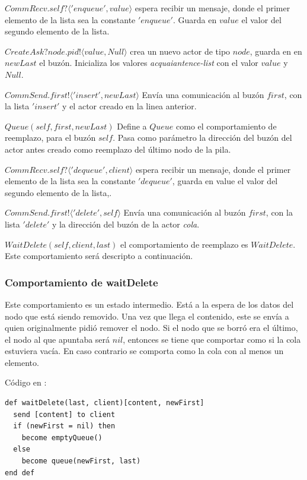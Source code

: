 \begin{description}
 \item $CommRecv.self? \langle 'enqueue', value \rangle$ espera recibir un mensaje, donde el primer elemento de la lista sea la constante $'enqueue'$. Guarda en $value$ el valor del segundo elemento de la lista.
 \item $CreateAsk?node.pid!\langle value, Null \rangle$ crea un nuevo actor de tipo $node$, guarda en en $newLast$ el buzón. Inicializa los valores \textit{acquaiantence-list} con el valor $value$ y $Null$.
 \item $CommSend.first!\langle 'insert', newLast \rangle$ Envía una comunicación al buzón $first$, con la lista $'insert'$ y el actor creado en la linea anterior. 
 \item $Queue(self, first, newLast)$ Define a $Queue$ como el comportamiento de reemplazo, para el buzón $self$. Pasa como parámetro la dirección del buzón del actor antes creado como reemplazo del último nodo de la pila.
 \item $CommRecv.self?\langle 'dequeue', client \rangle$ espera recibir un mensaje, donde el primer elemento de la lista sea la constante $'dequeue'$, guarda en value el valor del segundo elemento de la lista,.
 \item $CommSend.first!\langle 'delete', self \rangle$ Envía una comunicación al buzón $first$, con la lista $'delete'$ y la dirección del buzón de la actor \textit{cola}. 
 \item $WaitDelete(self, client, last)$ el comportamiento de reemplazo es $WaitDelete$. Este comportamiento será descripto a continuación.
 \end{description}

\subsubsection*{Comportamiento de waitDelete}
Este comportamiento es un estado intermedio. Está a la espera de los datos del nodo que está siendo removido. Una vez que llega el contenido, este se envía a quien originalmente pidió remover el nodo. Si el nodo que se borró era el último, el nodo al que apuntaba será $nil$, entonces se tiene que comportar como si la cola estuviera vacía. En caso contrario se comporta como la cola con al menos un elemento.

Código en \SAL:

\begin{lstlisting}[language=sal, style=simple]
def waitDelete(last, client)[content, newFirst]
  send [content] to client
  if (newFirst = nil) then
    become emptyQueue()
  else
    become queue(newFirst, last)
end def
\end{lstlisting}

